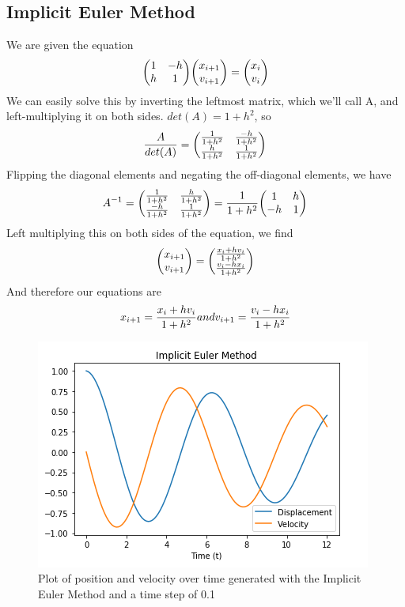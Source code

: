 \documentclass{article}
\begin{document}
\subsection{Implicit Euler Method}

We are given the equation 
$$
    \mqty(1 & -h \\ h & 1) \mqty(x_{i+1} \\ v_{i+1}) = \mqty(x_{i} \\ v_{i})
$$
We can easily solve this by inverting the leftmost matrix, which we'll call A, and left-multiplying it on both sides. $det(A) = 1 +h^2$, so 
$$
\frac{A}{det(A)} = \mqty(\frac{1}{1 + h^2} & \frac{-h}{1 + h^2} \\ \frac{h}{1 + h^2} & \frac{1}{1 + h^2})
$$
Flipping the diagonal elements and negating the off-diagonal elements, we have
$$
A^{-1} = \mqty(\frac{1}{1 + h^2} & \frac{h}{1 + h^2} \\ \frac{-h}{1 + h^2} & \frac{1}{1 + h^2}) = \frac{1}{1 + h^2} \mqty(1 & h \\ -h & 1)
$$
Left multiplying this on both sides of the equation, we find
$$
\mqty(x_{i+1} \\ v_{i+1}) = \mqty(\frac{x_{i} + h v_{i}}{1 + h^2} \\ \frac{v_{i} - h x_{i}}{1 + h^2})
$$
And therefore our equations are
$$
x_{i+1} = \frac{x_{i} + h v_{i}}{1 + h^2} \space and \space v_{i+1} = \frac{v_{i} - h x_{i}}{1 + h^2}
$$

\begin{figure}[ht]
\centering
\includegraphics[scale=0.35]{imp_euler.png}
\caption{Plot of position and velocity over time generated with the Implicit Euler Method and a time step of 0.1}
\label{fig:impeuler}
\end{figure}
\end{document}
